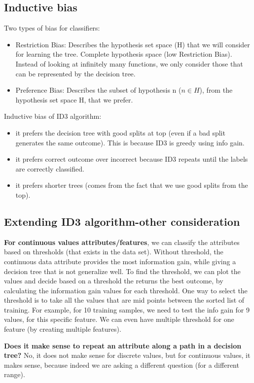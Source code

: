 \documentclass[12pt]{report}
\begin{document}
\subsection{Inductive bias}
Two types of bias for classifiers:
\begin{itemize}
	\item Restriction Bias: Describes the hypothesis set space (H) that we will consider for learning the tree.
	Complete hypothesis space (low Restriction Bias). Instead of looking at infinitely many functions, we only consider those that can be represented by the decision tree.
	\item Preference Bias: Describes the subset of hypothesis n ($n \in H $), from the hypothesis set space H, that we prefer.
\end{itemize}

Inductive bias of ID3 algorithm:
\begin{itemize}
\item it prefers the decision tree with good splits at top (even if a bad split generates the same outcome). This is because ID3 is greedy using info gain.
\item it prefers correct outcome over incorrect because ID3 repeats until the labels are correctly classified.
\item it prefers shorter trees (comes from the fact that we use good splits from the top).
\end{itemize}

\subsection{Extending ID3 algorithm-other consideration}
\textbf{For continuous values attributes/features}, we can classify the attributes based on thresholds (that exists in the data set). Without threshold, the continuous data attribute provides the most information gain, while giving a decision tree that is not generalize well. To find the threshold, we can plot the values and decide based on a threshold the returns the best outcome, by calculating the information gain values for each threshold. One way to select the threshold is to take all the values that are mid points between the sorted list of training. For example, for 10 training samples, we need to test the info gain for 9 values, for this specific feature. We can even have multiple threshold for one feature (by creating multiple features).

\textbf{Does it make sense to repeat an attribute along a path in a decision tree?} No, it does not make sense for discrete values, but for continuous values, it makes sense, because indeed we are asking a different question (for a different range).
\end{document}

